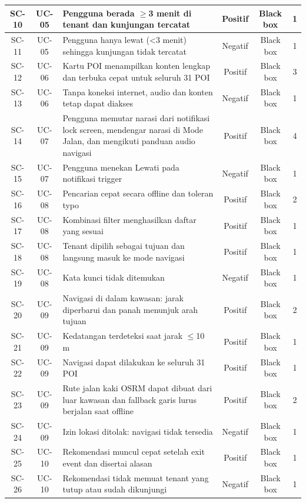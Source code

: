 \begin{longtable}{|C{0.09}|C{0.09}|L{0.48}|C{0.11}|C{0.13}|C{0.10}|}
SC-10 & UC-05 & Pengguna berada \(\ge\)3 menit di tenant dan kunjungan tercatat & Positif & Black box & 1 \\ \hline
SC-11 & UC-05 & Pengguna hanya lewat (<3 menit) sehingga kunjungan tidak tercatat & Negatif & Black box & 1 \\ \hline
SC-12 & UC-06 & Kartu POI menampilkan konten lengkap dan terbuka cepat untuk seluruh 31 POI & Positif & Black box & 3 \\ \hline
SC-13 & UC-06 & Tanpa koneksi internet, audio dan konten tetap dapat diakses & Negatif & Black box & 1 \\ \hline
SC-14 & UC-07 & Pengguna memutar narasi dari notifikasi lock screen, mendengar narasi di Mode Jalan, dan mengikuti panduan audio navigasi & Positif & Black box & 4 \\ \hline
SC-15 & UC-07 & Pengguna menekan Lewati pada notifikasi trigger & Negatif & Black box & 1 \\ \hline
SC-16 & UC-08 & Pencarian cepat secara offline dan toleran typo & Positif & Black box & 2 \\ \hline
SC-17 & UC-08 & Kombinasi filter menghasilkan daftar yang sesuai & Positif & Black box & 1 \\ \hline
SC-18 & UC-08 & Tenant dipilih sebagai tujuan dan langsung masuk ke mode navigasi & Positif & Black box & 1 \\ \hline
SC-19 & UC-08 & Kata kunci tidak ditemukan & Negatif & Black box & 1 \\ \hline
SC-20 & UC-09 & Navigasi di dalam kawasan: jarak diperbarui dan panah menunjuk arah tujuan & Positif & Black box & 2 \\ \hline
SC-21 & UC-09 & Kedatangan terdeteksi saat jarak \(\le\)10 m & Positif & Black box & 1 \\ \hline
SC-22 & UC-09 & Navigasi dapat dilakukan ke seluruh 31 POI & Positif & Black box & 1 \\ \hline
SC-23 & UC-09 & Rute jalan kaki OSRM dapat dibuat dari luar kawasan dan fallback garis lurus berjalan saat offline & Positif & Black box & 2 \\ \hline
SC-24 & UC-09 & Izin lokasi ditolak: navigasi tidak tersedia & Negatif & Black box & 1 \\ \hline
SC-25 & UC-10 & Rekomendasi muncul cepat setelah exit event dan disertai alasan & Positif & Black box & 1 \\ \hline
SC-26 & UC-10 & Rekomendasi tidak memuat tenant yang tutup atau sudah dikunjungi & Negatif & Black box & 1 \\ \hline

\end{longtable}
